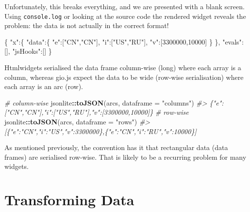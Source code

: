 \documentclass[10pt,]{krantz}
\makeatletter
\newenvironment{Shaded}{\begin{snugshade}}{\end{snugshade}}
\newcommand{\CommentTok}[1]{\textcolor[rgb]{0.37,0.37,0.37}{\textit{#1}}}
\newcommand{\DataTypeTok}[1]{\textcolor[rgb]{0.27,0.27,0.27}{#1}}
\newcommand{\DecValTok}[1]{\textcolor[rgb]{0.06,0.06,0.06}{#1}}
\newcommand{\FunctionTok}[1]{\textcolor[rgb]{0,0,0}{#1}}
\newcommand{\KeywordTok}[1]{\textcolor[rgb]{0.27,0.27,0.27}{\textbf{#1}}}
\newcommand{\NormalTok}[1]{#1}
\newcommand{\OperatorTok}[1]{\textcolor[rgb]{0.43,0.43,0.43}{\textbf{#1}}}
\newcommand{\OtherTok}[1]{\textcolor[rgb]{0.37,0.37,0.37}{#1}}
\newcommand{\StringTok}[1]{\textcolor[rgb]{0.5,0.5,0.5}{#1}}
\newenvironment{kframe}{%
\medskip{}
\setlength{\fboxsep}{.8em}
 \def\at@end@of@kframe{}%
 \ifinner\ifhmode%
  \def\at@end@of@kframe{\end{minipage}}%
  \begin{minipage}{\columnwidth}%
 \fi\fi%
 \def\FrameCommand##1{\hskip\@totalleftmargin \hskip-\fboxsep
 \colorbox{shadecolor}{##1}\hskip-\fboxsep
     \hskip-\linewidth \hskip-\@totalleftmargin \hskip\columnwidth}%
 \MakeFramed {\advance\hsize-\width
   \@totalleftmargin\z@ \linewidth\hsize
   \@setminipage}}%
 {\par\unskip\endMakeFramed%
 \at@end@of@kframe}
\renewenvironment{Shaded}{\begin{kframe}}{\end{kframe}}
\makeatother
\begin{document}
Unfortunately, this breaks everything, and we are presented with a blank screen. Using \texttt{console.log} or looking at the source code the rendered widget reveals the problem: the data is not actually in the correct format!

\begin{Shaded}
\begin{Highlighting}[]
\FunctionTok{\{}
  \DataTypeTok{"x"}\FunctionTok{:\{}
    \DataTypeTok{"data"}\FunctionTok{:\{}
      \DataTypeTok{"e"}\FunctionTok{:}\OtherTok{[}\StringTok{"CN"}\OtherTok{,}\StringTok{"CN"}\OtherTok{]}\FunctionTok{,}
      \DataTypeTok{"i"}\FunctionTok{:}\OtherTok{[}\StringTok{"US"}\OtherTok{,}\StringTok{"RU"}\OtherTok{]}\FunctionTok{,}
      \DataTypeTok{"v"}\FunctionTok{:}\OtherTok{[}\DecValTok{3300000}\OtherTok{,}\DecValTok{10000}\OtherTok{]}
    \FunctionTok{\}}
  \FunctionTok{\},}
  \DataTypeTok{"evals"}\FunctionTok{:}\OtherTok{[]}\FunctionTok{,}
  \DataTypeTok{"jsHooks"}\FunctionTok{:}\OtherTok{[]}
\FunctionTok{\}}
\end{Highlighting}
\end{Shaded}

Htmlwidgets serialised the data frame column-wise (long) where each array is a column, whereas gio.js expect the data to be wide (row-wise serialisation) where each array is an arc (row).

\begin{Shaded}
\begin{Highlighting}[]
\CommentTok{# column-wise}
\NormalTok{jsonlite}\OperatorTok{::}\KeywordTok{toJSON}\NormalTok{(arcs, }\DataTypeTok{dataframe =} \StringTok{"columns"}\NormalTok{)}
\CommentTok{#> \{"e":["CN","CN"],"i":["US","RU"],"v":[3300000,10000]\}}
\CommentTok{# row-wise}
\NormalTok{jsonlite}\OperatorTok{::}\KeywordTok{toJSON}\NormalTok{(arcs, }\DataTypeTok{dataframe =} \StringTok{"rows"}\NormalTok{)}
\CommentTok{#> [\{"e":"CN","i":"US","v":3300000\},\{"e":"CN","i":"RU","v":10000\}]}
\end{Highlighting}
\end{Shaded}

As mentioned previously, the convention has it that rectangular data (data frames) are serialised row-wise. That is likely to be a recurring problem for many widgets.

\hypertarget{widgets-full-transform-data}{%
\section{Transforming Data}\label{widgets-full-transform-data}}
\end{document}
